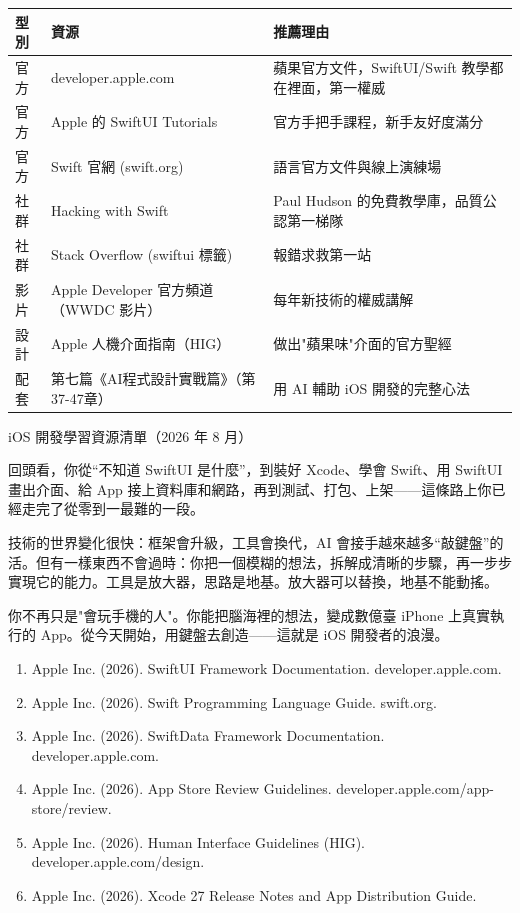\begin{center}
\begin{tabularx}{\linewidth}{|X|X|X|}
\hline
\textbf{型別} & \textbf{資源} & \textbf{推薦理由} \tabularnewline
\hline
官方 & developer.apple.com & 蘋果官方文件，SwiftUI/Swift 教學都在裡面，第一權威 \tabularnewline
官方 & Apple 的 SwiftUI Tutorials & 官方手把手課程，新手友好度滿分 \tabularnewline
官方 & Swift 官網 (swift.org) & 語言官方文件與線上演練場 \tabularnewline
社群 & Hacking with Swift & Paul Hudson 的免費教學庫，品質公認第一梯隊 \tabularnewline
社群 & Stack Overflow (swiftui 標籤) & 報錯求救第一站 \tabularnewline
影片 & Apple Developer 官方頻道（WWDC 影片） & 每年新技術的權威講解 \tabularnewline
設計 & Apple 人機介面指南（HIG） & 做出"蘋果味"介面的官方聖經 \tabularnewline
配套 & 第七篇《AI程式設計實戰篇》（第37-47章） & 用 AI 輔助 iOS 開發的完整心法 \tabularnewline
\hline
\end{tabularx}
\end{center}

\begin{center}\small\color{gray}iOS 開發學習資源清單（2026 年 8 月）\end{center}


回頭看，你從“不知道 SwiftUI 是什麼”，到裝好 Xcode、學會 Swift、用 SwiftUI 畫出介面、給 App 接上資料庫和網路，再到測試、打包、上架——這條路上你已經走完了從零到一最難的一段。

技術的世界變化很快：框架會升級，工具會換代，AI 會接手越來越多“敲鍵盤”的活。但有一樣東西不會過時：你把一個模糊的想法，拆解成清晰的步驟，再一步步實現它的能力。工具是放大器，思路是地基。放大器可以替換，地基不能動搖。

你不再只是"會玩手機的人"。你能把腦海裡的想法，變成數億臺 iPhone 上真實執行的 App。從今天開始，用鍵盤去創造——這就是 iOS 開發者的浪漫。


\begin{enumerate}
  \item Apple Inc. (2026). SwiftUI Framework Documentation. developer.apple.com.
  \item Apple Inc. (2026). Swift Programming Language Guide. swift.org.
  \item Apple Inc. (2026). SwiftData Framework Documentation. developer.apple.com.
  \item Apple Inc. (2026). App Store Review Guidelines. developer.apple.com/app-store/review.
  \item Apple Inc. (2026). Human Interface Guidelines (HIG). developer.apple.com/design.
  \item Apple Inc. (2026). Xcode 27 Release Notes and App Distribution Guide.
\end{enumerate}
